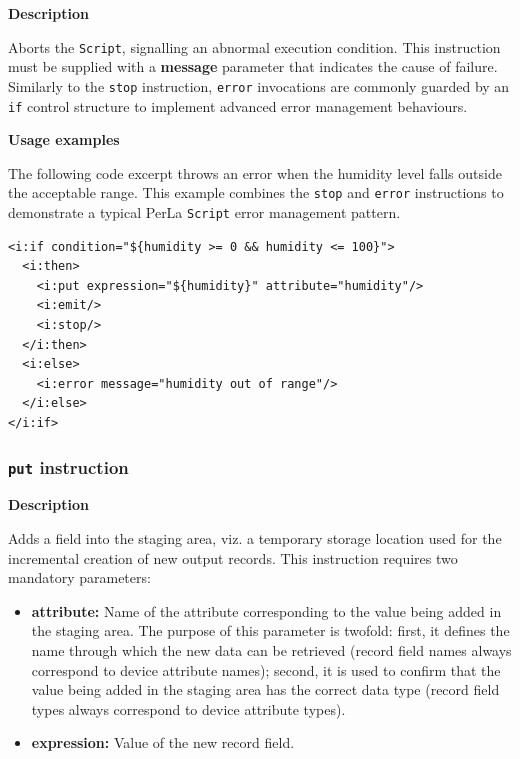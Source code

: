 \textbf{Description}

Aborts the \texttt{Script}, signalling an abnormal execution condition. This
instruction must be supplied with a \textbf{message} parameter that indicates
the cause of failure. Similarly to the \texttt{stop} instruction,
\texttt{error} invocations are commonly guarded by an \texttt{if} control
structure to implement advanced error management behaviours.

\textbf{Usage examples}

The following code excerpt throws an error when the humidity level falls
outside the acceptable range. This example combines the \texttt{stop} and
\texttt{error} instructions to demonstrate a typical PerLa \texttt{Script}
error management pattern.

\lstset{language=XML}
\begin{lstlisting}
<i:if condition="${humidity >= 0 && humidity <= 100}"> 
  <i:then>
    <i:put expression="${humidity}" attribute="humidity"/>
    <i:emit/>
    <i:stop/>
  </i:then>
  <i:else>
    <i:error message="humidity out of range"/>
  </i:else>
</i:if>
\end{lstlisting}


\subsubsection{\texttt{put} instruction}

\textbf{Description}

Adds a field into the staging area, viz. a temporary storage location used
for the incremental creation of new output records. This instruction requires
two mandatory parameters:

\begin{itemize}

    \item \textbf{attribute:} Name of the attribute corresponding to the value
        being added in the staging area. The purpose of this parameter is
        twofold: first, it defines the name through which the new data can be
        retrieved (record field names always correspond to device attribute
        names); second, it is used to confirm that the value being added in the
        staging area has the correct data type (record field types always
        correspond to device attribute types).

    \item \textbf{expression:} Value of the new record field.

\end{itemize}

